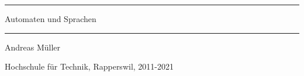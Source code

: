 \documentclass[a4paper,12pt]{book}
\begin{document}
\pagestyle{fancy}
\rhead{}
\frontmatter
\newcommand\HRule{\noindent\rule{\linewidth}{1.5pt}}
\begin{titlepage}
\HRule
\vspace*{10pt}
\begin{flushright}
{\Huge Automaten und Sprachen}
\end{flushright}
\HRule
\begin{flushright}
\vspace{30pt}
\LARGE
Andreas Müller
\end{flushright}
\begin{center}
Hochschule für Technik, Rapperswil, 2011-2021
\end{center}
\end{titlepage}
\hypersetup{
    linktoc=all,
    linkcolor=blue
}
\tableofcontents
\newtheorem{satz}{Satz}[chapter]
\newtheorem{hilfssatz}[satz]{Hilfssatz}
\newtheorem{definition}[satz]{Definition}
\newtheorem{annahme}[satz]{Annahme}
\newenvironment{beispiel}[1][Beispiel]{%
\begin{proof}[#1]%
\renewcommand{\qedsymbol}{$\bigcirc$}
}{\end{proof}}
\def\blank{\text{\textvisiblespace}}
\mainmatter
\begin{refsection}









\appendix

\vfill
\pagebreak
\ifodd\value{page}\else\null\clearpage\fi
\lhead{}
\rhead{}
\printbibliography[heading=subbibliography]
\end{refsection}


\end{document}
